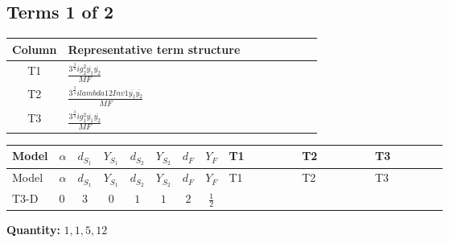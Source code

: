 \documentclass[8pt]{article}
\begin{document}
\begin{landscape}
\subsection*{Terms 1 of 2}
\begin{center}
\begin{tabular}{@{}c >{\raggedright\arraybackslash}p{0.82\linewidth}@{}}
\toprule
Column & Representative term structure \\
\midrule
T1 & \(\displaystyle \frac{3^{\frac{3}{4}} i g_{2}^{2} \overline{y_{1}} \overline{y_{2}}}{MF}\) \\
\midrule
T2 & \(\displaystyle \frac{3^{\frac{3}{4}} i lambda12Inv1 \overline{y_{1}} \overline{y_{2}}}{MF}\) \\
\midrule
T3 & \(\displaystyle \frac{3^{\frac{3}{4}} i g_{1}^{2} \overline{y_{1}} \overline{y_{2}}}{MF}\) \\
\midrule
\bottomrule
\end{tabular}
\end{center}
\smallskip
\tiny
\begin{longtable}{@{}llcccccc >{\raggedright\arraybackslash}p{0.21\linewidth} >{\raggedright\arraybackslash}p{0.21\linewidth} >{\raggedright\arraybackslash}p{0.21\linewidth}@{}}
\toprule
Model & $\alpha$ & $d_{S_1}$ & $Y_{S_1}$ & $d_{S_2}$ & $Y_{S_2}$ & $d_F$ & $Y_F$ & T1 & T2 & T3 \\
\midrule
\endfirsthead
\toprule
Model & $\alpha$ & $d_{S_1}$ & $Y_{S_1}$ & $d_{S_2}$ & $Y_{S_2}$ & $d_F$ & $Y_F$ & T1 & T2 & T3 \\
\midrule
\endhead
T3-D & $0$ & $3$ & $0$ & $1$ & $1$ & $2$ & $\frac{1}{2}$ & \scriptsize\adjustbox{max width=\linewidth}{$\begin{gathered} - \frac{17 \cdot 3^{\frac{3}{4}} i g_{2}^{2} \overline{y_{1}} \overline{y_{2}}}{24 MF}\end{gathered}$} & \scriptsize\adjustbox{max width=\linewidth}{$\begin{gathered} - \frac{3^{\frac{3}{4}} i lambda12Inv1 \overline{y_{1}} \overline{y_{2}}}{6 MF}\end{gathered}$} & \scriptsize\adjustbox{max width=\linewidth}{$\begin{gathered} - \frac{3^{\frac{3}{4}} i g_{1}^{2} \overline{y_{1}} \overline{y_{2}}}{8 MF}\end{gathered}$} \\
\midrule
\bottomrule
\end{longtable}
\clearpage
\noindent\textbf{Quantity: }$\mathrm{1,1,5,12}$\par\smallskip

\end{landscape}
\end{document}
